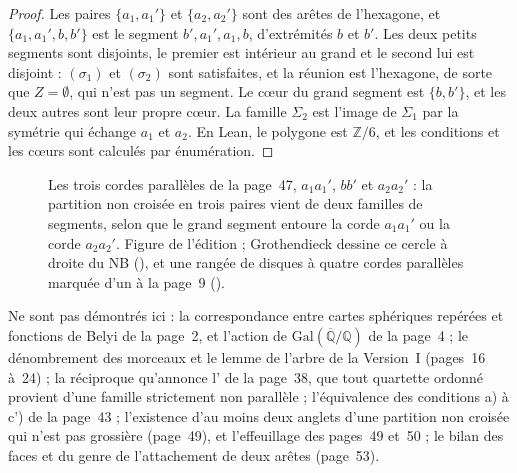 \begin{proof}
Les paires $\{a_1, a_1'\}$ et $\{a_2, a_2'\}$ sont des arêtes de l'hexagone, et $\{a_1, a_1', b, b'\}$ est le segment $b', a_1', a_1, b$, d'extrémités $b$ et $b'$. Les deux petits segments sont disjoints, le premier est intérieur au grand et le second lui est disjoint : $(\sigma_1)$ et $(\sigma_2)$ sont satisfaites, et la réunion est l'hexagone, de sorte que $Z = \emptyset$, qui n'est pas un segment. Le cœur du grand segment est $\{b, b'\}$, et les deux autres sont leur propre cœur. La famille $\Sigma_2$ est l'image de $\Sigma_1$ par la symétrie qui échange $a_1$ et $a_2$. En Lean, le polygone est $\mathbb Z/6$, et les conditions et les cœurs sont calculés par énumération.
\end{proof}

\begin{figure}[htbp]
\centering
{}
\caption{Les trois cordes parallèles de la page~47, $a_1a_1'$, $bb'$ et $a_2a_2'$ : la partition non croisée en trois paires vient de deux familles de segments, selon que le grand segment entoure la corde $a_1a_1'$ ou la corde $a_2a_2'$. Figure de l'édition ; Grothendieck dessine ce cercle à droite du NB (), et une rangée de disques à quatre cordes parallèles marquée d'un  à la page~9 ().}
\label{fig:81-cordes}
\end{figure}

Ne sont pas démontrés ici : la correspondance entre cartes sphériques repérées et fonctions de Belyi de la page~2, et l'action de $\mathrm{Gal}(\overline{\mathbb Q}/\mathbb Q)$ de la page~4 ; le dénombrement des morceaux et le lemme de l'arbre de la Version~I (pages~16 à~24) ; la réciproque qu'annonce l' de la page~38, que tout quartette ordonné provient d'une famille strictement non parallèle ; l'équivalence des conditions a) à c') de la page~43 ; l'existence d'au moins deux anglets d'une partition non croisée qui n'est pas grossière (page~49), et l'effeuillage des pages~49 et~50 ; le bilan des faces et du genre de l'attachement de deux arêtes (page~53).
